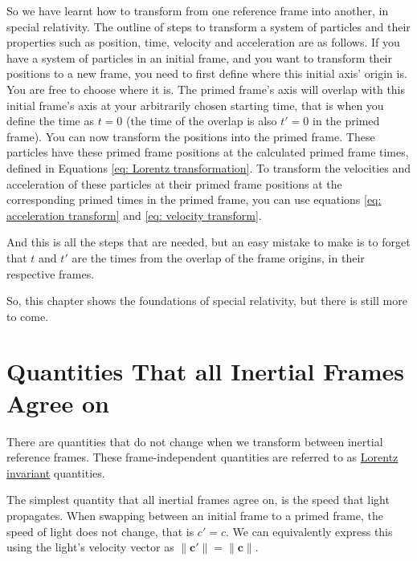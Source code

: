 So we have learnt how to transform from one reference frame into another, in special relativity.
The outline of steps to transform a system of particles and their properties such as position, time, velocity and acceleration are as follows.
If you have a system of particles in an initial frame, and you want to transform their positions to a new frame, you need to first define where this initial axis' origin is.
You are free to choose where it is.
The primed frame's axis will overlap with this initial frame's axis at your arbitrarily chosen starting time, that is when you define the time as ${t}=0$ (the time of the overlap is also ${t{'}}=0$ in the primed frame).
You can now transform the positions into the primed frame.
These particles have these primed frame positions at the calculated primed frame times, defined in Equations \eqref{eq: Lorentz transformation}.
To transform the velocities and acceleration of these particles at their primed frame positions at the corresponding primed times in the primed frame, you can use equations \eqref{eq: acceleration transform} and \eqref{eq: velocity transform}.

And this is all the steps that are needed, but an easy mistake to make is to forget that ${t}$ and ${t{'}}$ are the times from the overlap of the frame origins, in their respective frames.

So, this chapter shows the foundations of special relativity, but there is still more to come.



\printbibliography[segment=\therefsegment, heading=subbibliography]

\chapter{Quantities That all Inertial Frames Agree on} \label{ch: Invariant Quantities}

There are quantities that do not change when we transform between inertial reference frames.
These frame-independent quantities are referred to as \hyperlink{def-lorentz-invariant}{Lorentz invariant} quantities.

The simplest quantity that all inertial frames agree on, is the speed that light propagates.
When swapping between an initial frame to a primed frame, the speed of light does not change, that is $c'=c$.
We can equivalently express this using the light's velocity vector as $\|\mathbf{c}'\|=\|\mathbf{c}\|$.

